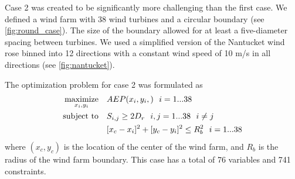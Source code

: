 \documentclass[a4paper]{jpconf}
\begin{document}
  Case 2 was created to be significantly more challenging than the first case. We defined a wind farm with 38 wind turbines and a circular boundary (see \cref{fig:round_case}). The size of the boundary allowed for at least a five-diameter spacing between turbines. We used a simplified version of the Nantucket wind rose binned into 12 directions with a constant wind speed of 10 m/s in all directions (see \cref{fig:nantucket}).


The optimization problem for case 2 was formulated as
%
\begin{equation}
	\label{e:objective}
	\begin{aligned} [b]
	\underset{x_i,y_i}{\textrm{maximize}} \quad & AEP(x_i,y_i,)~~i=1...38\\
	\textrm{subject to} \quad & S_{i,j} \geq 2\*D_{r}~~i,j=1...38~~i \neq j\\
	 & [x_c-x_i]^2+[y_c-y_i]^2 \leq R_{b}^2~~i=1...38
	\end{aligned}
\end{equation}
%
where $(x_c,y_c)$ is the location of the center of the wind farm, and $R_b$ is the radius of the wind farm boundary. This case has a total of 76 variables and 741 constraints.
\end{document}
